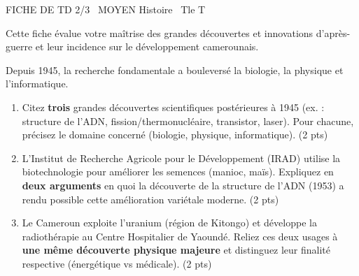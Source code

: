 \documentclass[11pt]{article}
\begin{document}
\begin{tcolorbox}[enhanced,colback=popink,colframe=popink,arc=10pt,boxrule=0pt,left=12pt,right=12pt,top=9pt,bottom=9pt]
{\color{white}\popxbold\small FICHE DE TD 2/3 \textbullet\ MOYEN \hfill Histoire \textbullet\ Tle T\par}
\end{tcolorbox}
\vspace{4pt}
Cette fiche évalue votre maîtrise des grandes découvertes et innovations d'après-guerre et leur incidence sur le développement camerounais.

\begin{exercice}
Depuis 1945, la recherche fondamentale a bouleversé la biologie, la physique et l'informatique.
\begin{enumerate}
    \item Citez \textbf{trois} grandes découvertes scientifiques postérieures à 1945 (ex. : structure de l'ADN, fission/thermonucléaire, transistor, laser). Pour chacune, précisez le domaine concerné (biologie, physique, informatique). \hfill (2 pts)
    \item L'Institut de Recherche Agricole pour le Développement (IRAD) utilise la biotechnologie pour améliorer les semences (manioc, maïs). Expliquez en \textbf{deux arguments} en quoi la découverte de la structure de l'ADN (1953) a rendu possible cette amélioration variétale moderne. \hfill (2 pts)
    \item Le Cameroun exploite l'uranium (région de Kitongo) et développe la radiothérapie au Centre Hospitalier de Yaoundé. Reliez ces deux usages à \textbf{une même découverte physique majeure} et distinguez leur finalité respective (énergétique vs médicale). \hfill (2 pts)
\end{enumerate}
\end{exercice}
\end{document}

